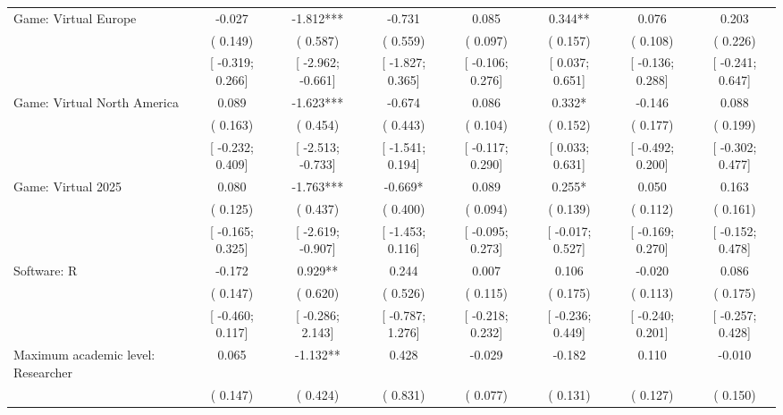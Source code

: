 \begin{tabular}{l*{7}{c}}
Game: Virtual Europe &   -0.027   &   -1.812***   &   -0.731   &    0.085   &    0.344**   &    0.076   &    0.203   \\
                    &(    0.149)   &(    0.587)   &(    0.559)   &(    0.097)   &(    0.157)   &(    0.108)   &(    0.226)   \\
                    &[   -0.319;     0.266]   &[   -2.962;    -0.661]   &[   -1.827;     0.365]   &[   -0.106;     0.276]   &[    0.037;     0.651]   &[   -0.136;     0.288]   &[   -0.241;     0.647]   \\
Game: Virtual North America &    0.089   &   -1.623***   &   -0.674   &    0.086   &    0.332*   &   -0.146   &    0.088   \\
                    &(    0.163)   &(    0.454)   &(    0.443)   &(    0.104)   &(    0.152)   &(    0.177)   &(    0.199)   \\
                    &[   -0.232;     0.409]   &[   -2.513;    -0.733]   &[   -1.541;     0.194]   &[   -0.117;     0.290]   &[    0.033;     0.631]   &[   -0.492;     0.200]   &[   -0.302;     0.477]   \\
Game: Virtual 2025 &    0.080   &   -1.763***   &   -0.669*   &    0.089   &    0.255*   &    0.050   &    0.163   \\
                    &(    0.125)   &(    0.437)   &(    0.400)   &(    0.094)   &(    0.139)   &(    0.112)   &(    0.161)   \\
                    &[   -0.165;     0.325]   &[   -2.619;    -0.907]   &[   -1.453;     0.116]   &[   -0.095;     0.273]   &[   -0.017;     0.527]   &[   -0.169;     0.270]   &[   -0.152;     0.478]   \\
Software: R &   -0.172   &    0.929**   &    0.244   &    0.007   &    0.106   &   -0.020   &    0.086   \\
                    &(    0.147)   &(    0.620)   &(    0.526)   &(    0.115)   &(    0.175)   &(    0.113)   &(    0.175)   \\
                    &[   -0.460;     0.117]   &[   -0.286;     2.143]   &[   -0.787;     1.276]   &[   -0.218;     0.232]   &[   -0.236;     0.449]   &[   -0.240;     0.201]   &[   -0.257;     0.428]   \\
Maximum academic level: Researcher &    0.065   &   -1.132**   &    0.428   &   -0.029   &   -0.182   &    0.110   &   -0.010   \\
                    &(    0.147)   &(    0.424)   &(    0.831)   &(    0.077)   &(    0.131)   &(    0.127)   &(    0.150)   \\

\end{tabular}
